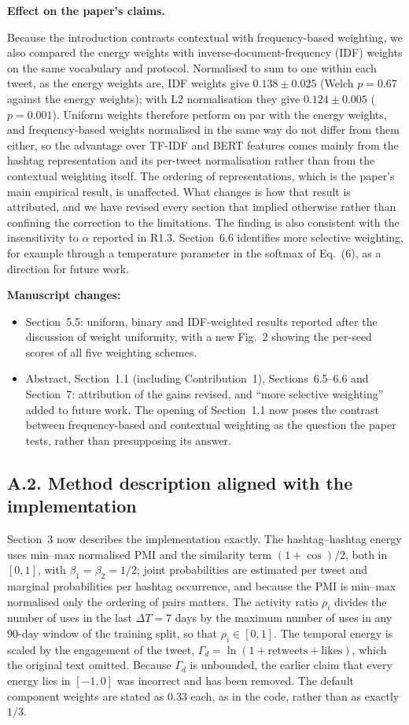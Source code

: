 \documentclass[11pt,a4paper]{article}
\newcommand{\parthead}[1]{\par\medskip\textbf{#1}\par}
\begin{document}
\parthead{Effect on the paper's claims.}
Because the introduction contrasts contextual with frequency-based weighting, we also compared the energy weights with inverse-document-frequency (IDF) weights on the same vocabulary and protocol. Normalised to sum to one within each tweet, as the energy weights are, IDF weights give $0.138 \pm 0.025$ (Welch $p = 0.67$ against the energy weights); with L2 normalisation they give $0.124 \pm 0.005$ ($p = 0.001$). Uniform weights therefore perform on par with the energy weights, and frequency-based weights normalised in the same way do not differ from them either, so the advantage over TF-IDF and BERT features comes mainly from the hashtag representation and its per-tweet normalisation rather than from the contextual weighting itself. The ordering of representations, which is the paper's main empirical result, is unaffected. What changes is how that result is attributed, and we have revised every section that implied otherwise rather than confining the correction to the limitations. The finding is also consistent with the insensitivity to $\alpha$ reported in R1.3. Section~6.6 identifies more selective weighting, for example through a temperature parameter in the softmax of Eq.~(6), as a direction for future work.

\parthead{Manuscript changes:}
\begin{itemize}
\item Section~5.5: uniform, binary and IDF-weighted results reported after the discussion of weight uniformity, with a new Fig.~2 showing the per-seed scores of all five weighting schemes.
\item Abstract, Section~1.1 (including Contribution~1), Sections~6.5--6.6 and Section~7: attribution of the gains revised, and ``more selective weighting'' added to future work. The opening of Section~1.1 now poses the contrast between frequency-based and contextual weighting as the question the paper tests, rather than presupposing its answer.
\end{itemize}

\subsection{A.2. Method description aligned with the implementation}

Section~3 now describes the implementation exactly. The hashtag--hashtag energy uses min--max normalised PMI and the similarity term $(1 + \cos)/2$, both in $[0, 1]$, with $\beta_1 = \beta_2 = 1/2$; joint probabilities are estimated per tweet and marginal probabilities per hashtag occurrence, and because the PMI is min--max normalised only the ordering of pairs matters. The activity ratio $\rho_i$ divides the number of uses in the last $\Delta T = 7$ days by the maximum number of uses in any 90-day window of the training split, so that $\rho_i \in [0, 1]$. The temporal energy is scaled by the engagement of the tweet, $\Gamma_d = \ln(1 + \text{retweets} + \text{likes})$, which the original text omitted. Because $\Gamma_d$ is unbounded, the earlier claim that every energy lies in $[-1, 0]$ was incorrect and has been removed. The default component weights are stated as 0.33 each, as in the code, rather than as exactly $1/3$.
\end{document}
